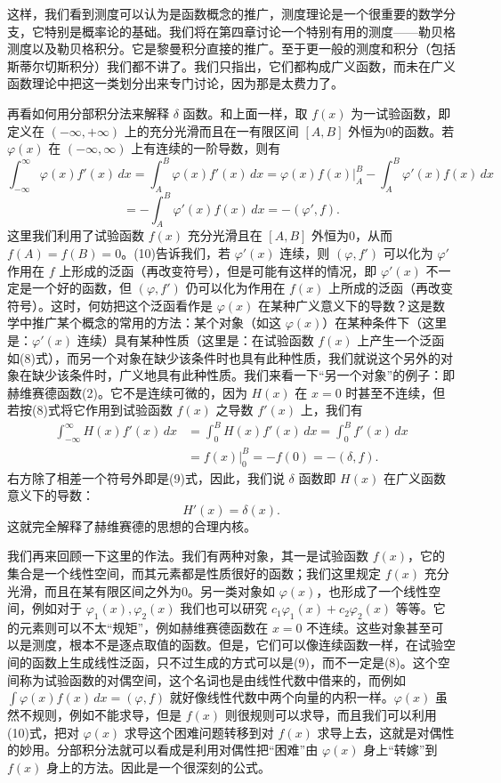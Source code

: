 这样，我们看到测度可以认为是函数概念的推广，测度理论是一个很重要的数学分支，它特别是概率论的基础。我们将在第四章讨论一个特别有用的测度——勒贝格测度以及勒贝格积分。它是黎曼积分直接的推广。至于更一般的测度和积分（包括斯蒂尔切斯积分）我们都不讲了。我们只指出，它们都构成广义函数，而未在广义函数理论中把这一类划分出来专门讨论，因为那是太费力了。

再看如何用分部积分法来解释 $\delta$ 函数。和上面一样，取 $f(x)$ 为一试验函数，即定义在 $(-\infty,+\infty)$ 上的充分光滑而且在一有限区间 $[A,B]$ 外恒为0的函数。若 $\varphi(x)$ 在 $(-\infty,\infty)$ 上有连续的一阶导数，则有
\[
\int_{-\infty}^{\infty}\varphi(x)f'(x)\,dx
=\int_A^B\varphi(x)f'(x)\,dx
=\left.\varphi(x)f(x)\right|_A^B-\int_A^B\varphi'(x)f(x)\,dx
\]
\[
=-\int_A^B\varphi'(x)f(x)\,dx=-(\varphi',f).
\tag{10}
\]
这里我们利用了试验函数 $f(x)$ 充分光滑且在 $[A,B]$ 外恒为0，从而 $f(A)=f(B)=0$。(10)告诉我们，若 $\varphi'(x)$ 连续，则 $(\varphi,f')$ 可以化为 $\varphi'$ 作用在 $f$ 上形成的泛函（再改变符号），但是可能有这样的情况，即 $\varphi'(x)$ 不一定是一个好的函数，但 $(\varphi,f')$ 仍可以化为作用在 $f(x)$ 上所成的泛函（再改变符号）。这时，何妨把这个泛函看作是 $\varphi(x)$ 在某种广义意义下的导数？这是数学中推广某个概念的常用的方法：某个对象（如这 $\varphi(x)$）在某种条件下（这里是：$\varphi'(x)$ 连续）具有某种性质（这里是：在试验函数 $f(x)$ 上产生一个泛函如(8)式），而另一个对象在缺少该条件时也具有此种性质，我们就说这个另外的对象在缺少该条件时，广义地具有此种性质。我们来看一下“另一个对象”的例子：即赫维赛德函数(2)。它不是连续可微的，因为 $H(x)$ 在 $x=0$ 时甚至不连续，但若按(8)式将它作用到试验函数 $f(x)$ 之导数 $f'(x)$ 上，我们有
\[
\begin{aligned}
\int_{-\infty}^{\infty}H(x)f'(x)\,dx
&=\int_0^B H(x)f'(x)\,dx
 =\int_0^B f'(x)\,dx\\
&=\left.f(x)\right|_0^B
 =-f(0)=-(\delta,f).
\end{aligned}
\]
右方除了相差一个符号外即是(9)式，因此，我们说 $\delta$ 函数即 $H(x)$ 在广义函数意义下的导数：
\[
H'(x)=\delta(x).
\]
这就完全解释了赫维赛德的思想的合理内核。

我们再来回顾一下这里的作法。我们有两种对象，其一是试验函数 $f(x)$，它的集合是一个线性空间，而其元素都是性质很好的函数；我们这里规定 $f(x)$ 充分光滑，而且在某有限区间之外为0。另一类对象如 $\varphi(x)$，也形成了一个线性空间，例如对于 $\varphi_1(x),\varphi_2(x)$ 我们也可以研究 $c_1\varphi_1(x)+c_2\varphi_2(x)$ 等等。它的元素则可以不太“规矩”，例如赫维赛德函数在 $x=0$ 不连续。这些对象甚至可以是测度，根本不是逐点取值的函数。但是，它们可以像连续函数一样，在试验空间的函数上生成线性泛函，只不过生成的方式可以是(9)，而不一定是(8)。这个空间称为试验函数的对偶空间，这个名词也是由线性代数中借来的，而例如 $\int\varphi(x)f(x)\,dx=(\varphi,f)$ 就好像线性代数中两个向量的内积一样。$\varphi(x)$ 虽然不规则，例如不能求导，但是 $f(x)$ 则很规则可以求导，而且我们可以利用(10)式，把对 $\varphi(x)$ 求导这个困难问题转移到对 $f(x)$ 求导上去，这就是对偶性的妙用。分部积分法就可以看成是利用对偶性把“困难”由 $\varphi(x)$ 身上“转嫁”到 $f(x)$ 身上的方法。因此是一个很深刻的公式。

